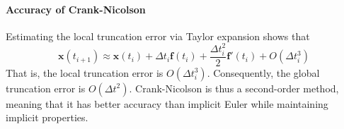 
\paragraph*{Accuracy of Crank-Nicolson}
Estimating the local truncation error via Taylor expansion shows that
\begin{equation}
    \mathbf{x}(t_{i+1}) \approx \mathbf{x}(t_i) + \Delta t_i \mathbf{f}(t_i) + \frac{\Delta t_i^2}{2} \mathbf{f}'(t_i) + O(\Delta t_i^3)
\end{equation}
That is, the local truncation error is $O(\Delta t_i^3)$. Consequently, the global truncation error is $O(\Delta t^2)$. Crank-Nicolson is thus a second-order method, meaning that it has better accuracy than implicit Euler while maintaining implicit properties.

